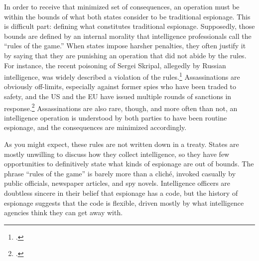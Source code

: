 \documentclass[11pt]{memoir}
\begin{document}
\begin{refsegment}



In order to receive that minimized set of consequences, an operation must be within the bounds of what both states consider to be traditional espionage. This is difficult part: defining what constitutes traditional espionage. Supposedly, those bounds are defined by an internal morality that intelligence professionals call the ``rules of the game.'' When states impose harsher penalties, they often justify it by saying that they are punishing an operation that did not abide by the rules. For instance, the recent poisoning of Sergei Skripal, allegedly by Russian intelligence, was widely described a violation of the rules.\footcite{masters_has_2018} Assassinations are obviously off-limits, especially against former spies who have been traded to safety, and the US and the EU have issued multiple rounds of sanctions in response.\footcite{reuters_e.u._2019} Assassinations are also rare, though, and more often than not, an intelligence operation is understood by both parties to have been routine espionage, and the consequences are minimized accordingly.

As you might expect, these rules are not written down in a treaty. States are mostly unwilling to discuss how they collect intelligence, so they have few opportunities to definitively state what kinds of espionage are out of bounds.  The phrase ``rules of the game'' is barely more than a clich\'e, invoked casually by public officials, newspaper articles, and spy novels. Intelligence officers are doubtless sincere in their belief that espionage has a code, but the history of espionage suggests that the code is flexible, driven mostly by what intelligence agencies think they can get away with.


\end{refsegment}
\end{document}

